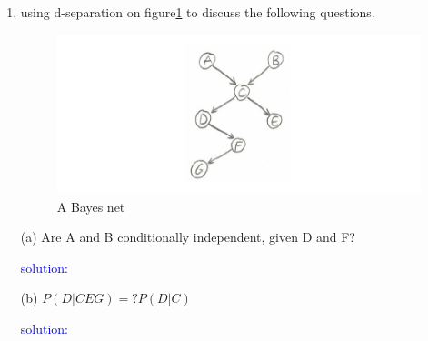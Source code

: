\documentclass[10pt]{article}
\begin{document}
\begin{enumerate}[1.]
\newpage
\item {} using d-separation on figure\ref{bayesnet} to discuss the following questions.
\begin{figure}[htbp]
    \centering
    \includegraphics[scale=0.5]{figs/p3_1.jpg}
    \caption{A Bayes net}
    \label{bayesnet}
    \end{figure} 

\item[(a)] Are A and B conditionally independent, given D and F? 

    \textcolor{blue}{solution:}

\item[(b)] $P(D|CEG) =? P(D|C)$

\textcolor{blue}{solution:}
\end{enumerate}
\end{document}

